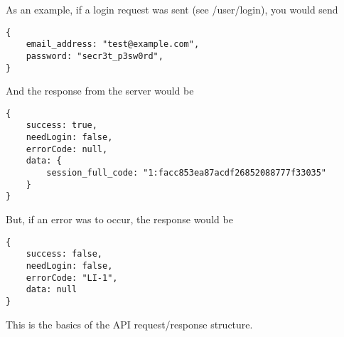 \documentclass{article}[11pt]
\begin{document}
As an example, if a login request was sent (see /user/login), you would send

\begin{verbatim}
{
    email_address: "test@example.com",
    password: "secr3t_p3sw0rd",
}
\end{verbatim}

And the response from the server would be
\begin{verbatim}
{
    success: true,
    needLogin: false,
    errorCode: null,
    data: {
    	session_full_code: "1:facc853ea87acdf26852088777f33035"
    }
}
\end{verbatim}

But, if an error was to occur, the response would be
\begin{verbatim}
{
    success: false,
    needLogin: false,
    errorCode: "LI-1",
    data: null
}
\end{verbatim}

This is the basics of the API request/response structure.

\newpage


\newcommand{\ErrorsBasic}{

\noindent
\textbf{Error Codes:} \\
W-0: Failure - Empty or null request body \\
}

\newcommand{\ErrorsMysql}{
\ErrorsBasic
W-1: Exception - An unknown error occurred in connecting to the database.  \\
W-2: Exception - An unknown error occurred in the server.  \\
}

\newcommand{\ErrorsSession}{
\ErrorsMysql
W-3: Failure - session\_full\_code was empty or null.  \\
W-4: Failure - session\_full\_code was invalid. Make sure its a valid session code received from /user/login.  \\
W-5: Exception - An unknown error occurred in the server.  \\
W-6: Exception - An unknown error occurred in finding the session.  \\
}
\end{document}
